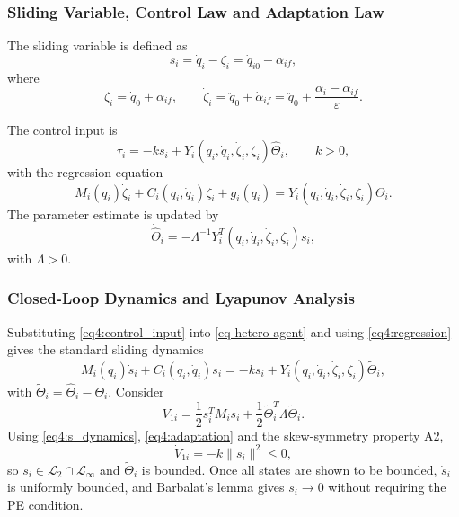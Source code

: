\subsubsection{Sliding Variable, Control Law and Adaptation Law}

The sliding variable is defined as
\begin{equation}\label{eq4:sliding_var}
	s_i = \dot{q}_i - \zeta_i = \dot{q}_{i0} - \alpha_{if},
\end{equation}
where
\begin{equation}\label{eq4:zeta}
	\zeta_i = \dot{q}_0 + \alpha_{if},\qquad
	\dot{\zeta}_i = \ddot{q}_0 + \dot{\alpha}_{if}
	= \ddot{q}_0 + \frac{\alpha_i - \alpha_{if}}{\varepsilon}.
\end{equation}

The control input is
\begin{equation}\label{eq4:control_input}
	\tau_i = -k s_i + Y_i(q_i,\dot{q}_i,\dot{\zeta}_i,\zeta_i) \hat{\Theta}_i,\qquad k>0,
\end{equation}
with the regression equation
\begin{equation}\label{eq4:regression}
	M_i(q_i)\dot{\zeta}_i + C_i(q_i,\dot{q}_i)\zeta_i + g_i(q_i)
	= Y_i(q_i,\dot{q}_i,\dot{\zeta}_i,\zeta_i)\Theta_i.
\end{equation}
The parameter estimate is updated by
\begin{equation}\label{eq4:adaptation}
	\dot{\hat{\Theta}}_i = -\Lambda^{-1} Y_i^T(q_i,\dot{q}_i,\dot{\zeta}_i,\zeta_i) s_i,
\end{equation}
with $\Lambda > 0$.

\subsubsection{Closed-Loop Dynamics and Lyapunov Analysis}

Substituting \eqref{eq4:control_input} into \eqref{eq hetero agent} and using
\eqref{eq4:regression} gives the standard sliding dynamics
\begin{equation}\label{eq4:s_dynamics}
	M_i(q_i)\dot{s}_i + C_i(q_i,\dot{q}_i)s_i
	= -k s_i + Y_i(q_i,\dot{q}_i,\dot{\zeta}_i,\zeta_i)\tilde{\Theta}_i,
\end{equation}
with $\tilde{\Theta}_i = \hat{\Theta}_i - \Theta_i$. Consider
\begin{equation}\label{eq4:V1}
	V_{1i} = \frac12 s_i^T M_i s_i + \frac12 \tilde{\Theta}_i^T \Lambda \tilde{\Theta}_i.
\end{equation}
Using \eqref{eq4:s_dynamics}, \eqref{eq4:adaptation} and the skew-symmetry property A2,
\begin{equation}\label{eq4:V1_dot}
	\dot{V}_{1i} = -k\|s_i\|^2 \le 0,
\end{equation}
so $s_i \in \mathcal{L}_2 \cap \mathcal{L}_\infty$ and $\tilde{\Theta}_i$ is bounded. Once
all states are shown to be bounded, $\dot{s}_i$ is uniformly bounded, and Barbalat's lemma
gives $s_i \to 0$ without requiring the PE condition.

